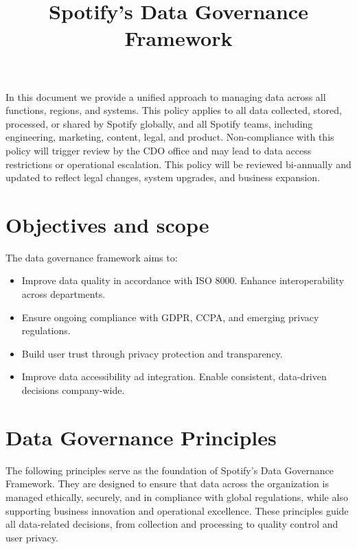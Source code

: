 \documentclass[11pt,a4paper,computermodern]{article}
\title{Spotify's Data Governance Framework}
\date{}
\begin{document}
\maketitle

\vspace{-10mm}


In this document we provide a unified approach to managing data across all functions, regions, and systems. This policy applies to all data collected, stored, processed, or shared by Spotify globally, and all Spotify teams, including engineering, marketing, content, legal, and product. Non-compliance with this policy will trigger review by the CDO office and may lead to data access restrictions or operational escalation. This policy will be reviewed bi-annually and updated to reflect legal changes, system upgrades, and business expansion.

\section*{Objectives and scope}

The data governance framework aims to:
\begin{itemize}[itemsep=5pt, parsep=0pt]
	\item Improve data quality in accordance with ISO 8000. Enhance interoperability across departments.
	\item Ensure ongoing compliance with GDPR, CCPA, and emerging privacy regulations.
	\item Build user trust through privacy protection and transparency.
	\item Improve data accessibility ad integration. Enable consistent, data-driven decisions company-wide.
\end{itemize}


\section*{Data Governance Principles}

The following principles serve as the foundation of Spotify’s Data Governance Framework. They are designed to ensure that data across the organization is managed ethically, securely, and in compliance with global regulations, while also supporting business innovation and operational excellence. These principles guide all data-related decisions, from collection and processing to quality control and user privacy.
\end{document}
